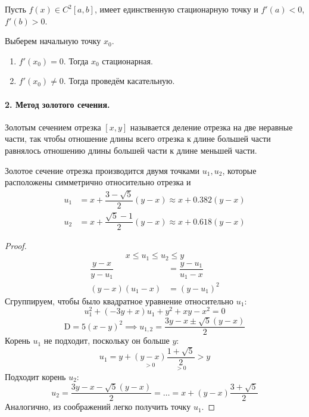 \begin{alg}
  Пусть $ f(x) \in C^2[a,b] $, имеет единственную стационарную точку и $ f'(a) <
  0$, $ f'(b) > 0 $.

  Выберем начальную точку $ x_0 $.
  \begin{enumerate}[label=(\roman*)]
    \item $f'(x_0) = 0$. Тогда $ x_0 $ стационарная.
    \item $f'(x_0) \neq 0$. Тогда проведём касательную.
  \end{enumerate}
  
\end{alg}

	\paragraph{2. Метод золотого сечения.}
	\begin{definition}
		Золотым сечением отрезка $\left[x,y\right]$ называется деление отрезка на две неравные части, так чтобы отношение длины всего отрезка к длине большей части равнялось отношению длины большей части к длине меньшей части.
	\end{definition}
	\begin{utv}
		Золотое сечение отрезка производится двумя точками $u_1, u_2$, которые расположены симметрично относительно отрезка и
		\begin{align}
			u_1 &= x+\dfrac{3-\sqrt{5}}{2}(y-x)\approx x+0.382(y-x)\\
			u_2 &= x+\dfrac{\sqrt{5}-1}{2}(y-x)\approx x+0.618(y-x)
		\end{align}
	\end{utv}
	\begin{proof}
	\begin{equation}
		x\leq u_1\leq u_2\leq y
	\end{equation}
	\begin{align}
		\dfrac{y-x}{y-u_1}&=\dfrac{y-u_1}{u_1-x}\\
		(y-x)(u_1-x)&=(y-u_1)^2
	\end{align}
	Сгруппируем, чтобы было квадратное уравнение относительно $u_1$:
	\begin{equation}
		u_1^2 + (-3y+x)u_1+y^2+xy-x^2=0
	\end{equation}
	\begin{equation}
		\mathrm{D}=5(x-y)^2 \implies u_{1,2}=\dfrac{3y-x\pm\sqrt{5}(y-x)}{2}
	\end{equation}
	Корень $u_1$ не подходит, поскольку он больше $y$:
	\begin{equation}
		u_1 = y+\underset{>0}{(y-x)}\underset{>0}{\dfrac{1+\sqrt{5}}{2}} > y
	\end{equation}
	Подходит корень $u_2$:
	\begin{equation}
		u_2 = \dfrac{3y-x-\sqrt{5}(y-x)}{2} = \dots = x+(y-x)\dfrac{3+\sqrt{5}}{2}
	\end{equation}
	Аналогично, из соображений легко получить точку $u_1$.
	\end{proof}
